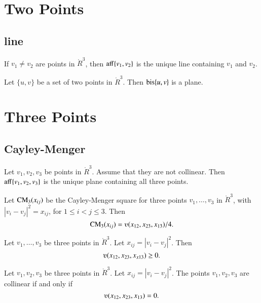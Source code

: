 \newpage
\section{Two Points}

\subsection{line}

\begin{lemma}
	If $v_1\ne v_2$ are points in $\ring{R}^3$, then ${\operatorname{aff}}\{v_1,v_2\}$ is the unique
line containing $v_1$ and $v_2$.
\end{lemma}

\newpage

\begin{lemma}
Let $\{u,v\}$ be a set of two points in 
$\ring{R}^3$.  Then ${\operatorname{bis}}\{u,v\}$ is a plane.
\end{lemma}

\section{Three Points}

\subsection{Cayley-Menger}



\begin{lemma}
	Let $v_1,v_2,v_3$ be points in $\ring{R}^3$.  Assume that they are not collinear.
Then ${\operatorname{aff}}\{v_1,v_2,v_3\}$ is the unique plane containing all three points.
\end{lemma}

\begin{lemma}
	Let ${\operatorname{CM}}_3(x_{ij})$ be the Cayley-Menger square for
three points $v_1,\ldots,v_3$ in $\ring{R}^3$, with $|v_i-v_j|^2 = x_{ij}$,
for $1\le i < j \le 3$.  Then
	$$\op{CM}_3(x_{ij}) = \ups(x_{12},x_{23},x_{13})/4.$$
\end{lemma}

\begin{lemma}
Let $v_1,\ldots,v_3$ be three points
in $\ring{R}^3$.  Let $x_{ij} = |v_i-v_j|^2$.  Then
	$$\ups(x_{12},x_{23},x_{x13})\ge0.$$
\end{lemma}

\begin{lemma}
Let $v_1,v_2,v_3$ be three points
in $\ring{R}^3$.  Let $x_{ij} = |v_i-v_j|^2$.
The points $v_1,v_2,v_3$ are collinear if and only if
	$$\ups(x_{12},x_{23},x_{13}) = 0.$$
\end{lemma}

